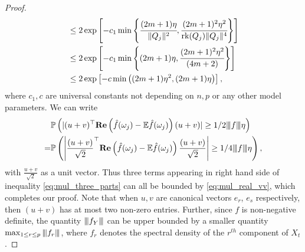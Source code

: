 \begin{proof}
\begin{equation}
\begin{aligned}
&\le 2\exp\left[-c_1\min\left\{\cfrac{(2m+1)\eta}{\|Q_j\|^2}, \cfrac{(2m+1)^2\eta^2}{\mbox{rk}(Q_j)\|Q_j\|^4}\right\}\right] \\
&\le 2\exp\left[-c_1\min\left\{(2m+1)\eta, \cfrac{(2m+1)^2\eta^2}{(4m+2)}\right\}\right] \\
& \le 2\exp\left[-c\min\left((2m+1)\eta^2, (2m+1)\eta\right)\right],
\end{aligned}
\end{equation}
where $c_1, c$ are universal constants not depending on $n,p$ { or any other model parameters}. 
We can write 
\begin{equation}
\begin{aligned}
&\mathbb{P}\left(|(u+v)^\top \mathrm{\bf{Re}}\left(\hat{f}(\omega_j) - \mathbb{E}\hat{f}(\omega_j)\right)(u+v)|\ge 1/2 {\left\vert\kern-0.25ex\left\vert\kern-0.25ex\left\vert f \right\vert\kern-0.25ex\right\vert\kern-0.25ex\right\vert} \eta \right) \\
=& \mathbb{P}\left(\left|\frac{(u+v)}{\sqrt{2}}^\top \mathrm{\bf{Re}}\left(\hat{f}(\omega_j) - \mathbb{E} \hat{f}(\omega_j)\right)\frac{(u+v)}{\sqrt{2}}\right|\ge 1/4 {\left\vert\kern-0.25ex\left\vert\kern-0.25ex\left\vert f \right\vert\kern-0.25ex\right\vert\kern-0.25ex\right\vert} \eta \right),\nonumber
\end{aligned}
\end{equation}
with $\frac{u+v}{\sqrt{2}}$ as a unit vector. Thus three terms appearing in right hand side of inequality \eqref{eq:mul_three_parts} can all be bounded by \eqref{eq:mul_real_vv}, which completes our proof.  Note that when $u, v$ are canonical vectors $e_r$, $e_s$ respectively, then $(u+v)$ has at most two non-zero entries. Further, since $f$ is non-negative definite, the quantity ${\left\vert\kern-0.25ex\left\vert\kern-0.25ex\left\vert f_Y \right\vert\kern-0.25ex\right\vert\kern-0.25ex\right\vert}$ can be upper bounded by a smaller quantity $\max_{1 \le r \le p} {\left\vert\kern-0.25ex\left\vert\kern-0.25ex\left\vert f_{r} \right\vert\kern-0.25ex\right\vert\kern-0.25ex\right\vert}$, where $f_r$ denotes the spectral density of the $r^{th}$ component of $X_t$.
\smallskip


\end{proof}
